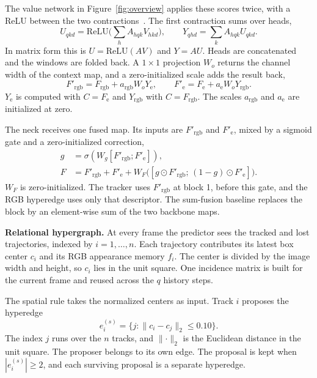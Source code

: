 \documentclass[10pt,twocolumn,letterpaper]{article}
\begin{document}
The value network in Figure~\ref{fig:overview} applies these scores twice, with a ReLU between the two contractions~\cite{schug2025hyla}. The first contraction sums over heads,
\begin{equation}
U_{qkd}=\mathrm{ReLU}\Big(\sum_{h} A_{hqk}V_{hkd}\Big),\qquad
Y_{qhd}=\sum_{k} A_{hqk}U_{qkd}.
\end{equation}
In matrix form this is $U=\mathrm{ReLU}(AV)$ and $Y=AU$. Heads are concatenated and the windows are folded back. A $1\times1$ projection $W_o$ returns the channel width of the context map, and a zero-initialized scale adds the result back,
\begin{equation}
F'_{\mathrm{rgb}}=F_{\mathrm{rgb}}+a_{\mathrm{rgb}}W_o Y_{\mathrm{e}},\qquad
F'_{\mathrm{e}}=F_{\mathrm{e}}+a_{\mathrm{e}}W_o Y_{\mathrm{rgb}}.
\end{equation}
$Y_{\mathrm{e}}$ is computed with $C=F_{\mathrm{e}}$ and $Y_{\mathrm{rgb}}$ with $C=F_{\mathrm{rgb}}$. The scales $a_{\mathrm{rgb}}$ and $a_{\mathrm{e}}$ are initialized at zero.

The neck receives one fused map. Its inputs are $F'_{\mathrm{rgb}}$ and $F'_{\mathrm{e}}$, mixed by a sigmoid gate and a zero-initialized correction,
\begin{align}
g&=\sigma(W_g[F'_{\mathrm{rgb}};F'_{\mathrm{e}}]),\\
F &= F'_{\mathrm{rgb}} + F'_{\mathrm{e}} + W_F\big([g\odot F'_{\mathrm{rgb}};\,(1-g)\odot F'_{\mathrm{e}}]\big).
\end{align}
$W_F$ is zero-initialized. The tracker uses $F'_{\mathrm{rgb}}$ at block 1, before this gate, and the RGB hyperedge uses only that descriptor. The sum-fusion baseline replaces the block by an element-wise sum of the two backbone maps.


\textbf{Relational hypergraph.}
At every frame the predictor sees the tracked and lost trajectories, indexed by $i=1,\ldots,n$. Each trajectory contributes its latest box center $c_i$ and its RGB appearance memory $f_i$. The center is divided by the image width and height, so $c_i$ lies in the unit square. One incidence matrix is built for the current frame and reused across the $q$ history steps.

The spatial rule takes the normalized centers as input. Track $i$ proposes the hyperedge
\begin{equation}
e_i^{(s)}=\{j:\lVert c_i-c_j\rVert_2\le 0.10\}.
\end{equation}
The index $j$ runs over the $n$ tracks, and $\lVert\cdot\rVert_2$ is the Euclidean distance in the unit square. The proposer belongs to its own edge. The proposal is kept when $|e_i^{(s)}|\ge 2$, and each surviving proposal is a separate hyperedge.
\end{document}
